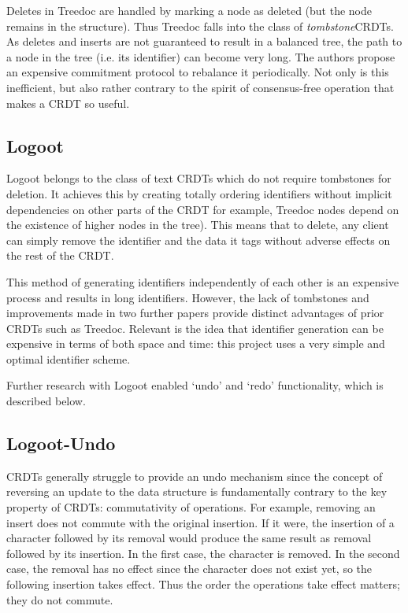 \documentclass[12pt,a4paper,twoside,openright]{report}
\begin{document}
Deletes in Treedoc are handled by marking a node as deleted (but the node remains in the structure). Thus Treedoc falls into the class of \textit{tombstone}CRDTs. As deletes and inserts are not guaranteed to result in a balanced tree, the path to a node in the tree (i.e. its identifier) can become very long. The authors propose an expensive commitment protocol to rebalance it periodically. Not only is this inefficient, but also rather contrary to the spirit of consensus-free operation that makes a CRDT so useful.

\subsection{Logoot} \label{sec:logoot}

Logoot \cite{weiss2008} belongs to the class of text CRDTs which do not require tombstones for deletion. It achieves this by creating totally ordering identifiers without implicit dependencies on other parts of the CRDT for example, Treedoc nodes depend on the existence of higher nodes in the tree). This means that to delete, any client can simply remove the identifier and the data it tags without adverse effects on the rest of the CRDT.

This method of generating identifiers independently of each other is an expensive process and results in long identifiers. However, the lack of tombstones and improvements made in two further papers \cite{nedelec2013lseq} \cite{nedelec2013} provide distinct advantages of prior CRDTs such as Treedoc. Relevant is the idea that identifier generation can be expensive in terms of both space and time: this project uses a very simple and optimal identifier scheme.

Further research with Logoot enabled `undo' and `redo' functionality, which is described below.


\subsection{Logoot-Undo} \label{sec:logootundo}

CRDTs generally struggle to provide an undo mechanism since the concept of reversing an update to the data structure is fundamentally contrary to the key property of CRDTs: commutativity of operations. For example, removing an insert does not commute with the original insertion. If it were, the insertion of a character followed by its removal would produce the same result as removal followed by its insertion. In the first case, the character is removed. In the second case, the removal has no effect since the character does not exist yet, so the following insertion takes effect. Thus the order the operations take effect matters; they do not commute.
\end{document}
